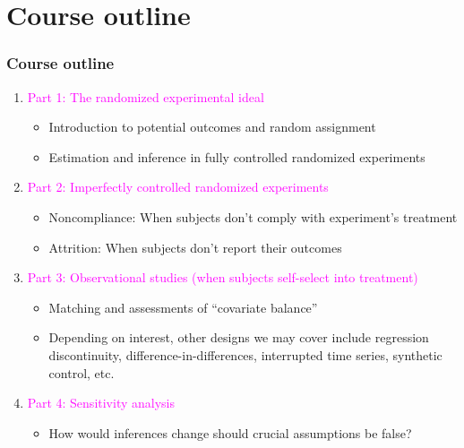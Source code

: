 \documentclass[table, xcolor = {dvipsnames}, 9pt]{beamer}
\theoremstyle{plain}
\begin{document}
\section{Course outline}
\begin{frame}[t]
\frametitle{Course outline}
\vfill
\begin{enumerate} \vfill
\item[] \textcolor{magenta}{Part 1: The randomized experimental ideal} \vfill
\begin{itemize} \vfill
\item Introduction to potential outcomes and random assignment \vfill
\item Estimation and inference in fully controlled randomized experiments \vfill
\end{itemize} \vfill
\item[] \textcolor{magenta}{Part 2: Imperfectly controlled randomized experiments} \vfill
\begin{itemize} \vfill
\item Noncompliance: When subjects don't comply with experiment's treatment \vfill
\item Attrition: When subjects don't report their outcomes \vfill
\end{itemize} \vfill
\item[] \textcolor{magenta}{Part 3: Observational studies (when subjects self-select into treatment)} \vfill
\begin{itemize} \vfill
\item Matching and assessments of ``covariate balance'' \vfill
\item Depending on interest, other designs we may cover include regression discontinuity, difference-in-differences, interrupted time series, synthetic control, etc. \vfill
\end{itemize} \vfill
\item \textcolor{magenta}{Part 4: Sensitivity analysis} \vfill
\begin{itemize} \vfill
\item How would inferences change should crucial assumptions be false? \vfill
\end{itemize} \vfill
\end{enumerate}
\vfill
\end{frame}
\end{document}
